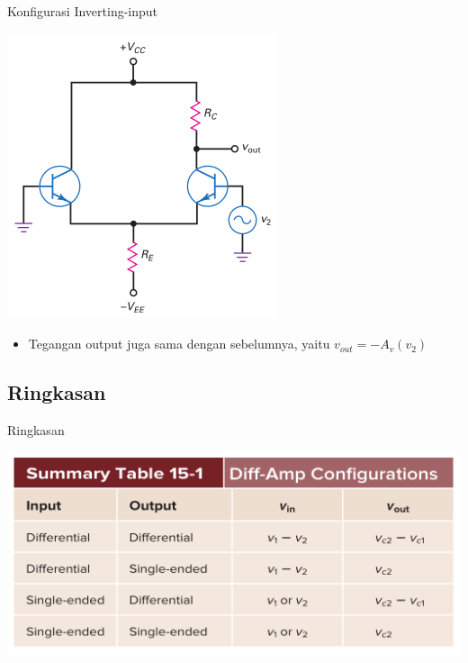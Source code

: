 \documentclass[aspectratio=169]{beamer}
\begin{document}
\begin{frame}{Konfigurasi Inverting-input}
	\begin{multicols}{2}
		\begin{center}
			\includegraphics[height=0.7\textheight]{gambar/01.diff-amp/01.inverting_input+single-ended_output}
		\end{center}
		\columnbreak
		\begin{itemize}
			\item Tegangan output juga sama dengan sebelumnya, yaitu $ v_{out} = -A_v(v_2) $
		\end{itemize}
	\end{multicols}
\end{frame}

\subsection{Ringkasan}
\begin{frame}{Ringkasan}
	\begin{center}
		\includegraphics[height=0.6\textheight]{gambar/01.diff-amp/01.ringkasan_dif-amp-conf}
	\end{center}
\end{frame}
\end{document}
